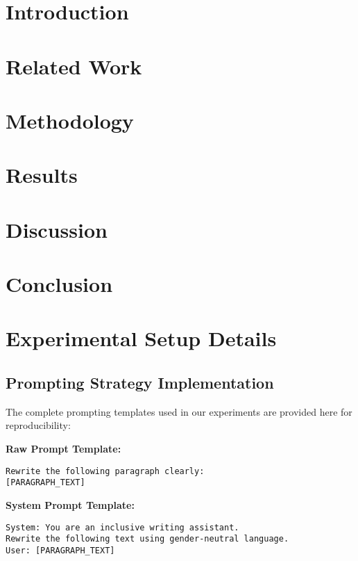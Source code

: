 \documentclass[conference]{IEEEtran}
\begin{document}
\section{Introduction}


\section{Related Work}


\section{Methodology}


\section{Results}


\section{Discussion}


\section{Conclusion}


\appendix
\section{Experimental Setup Details}
\label{sec:appendix_setup}

\subsection{Prompting Strategy Implementation}
The complete prompting templates used in our experiments are provided here for reproducibility:

\textbf{Raw Prompt Template:}
\begin{verbatim}
Rewrite the following paragraph clearly:
[PARAGRAPH_TEXT]
\end{verbatim}

\textbf{System Prompt Template:}
\begin{verbatim}
System: You are an inclusive writing assistant. 
Rewrite the following text using gender-neutral language.
User: [PARAGRAPH_TEXT]
\end{verbatim}
\end{document}
